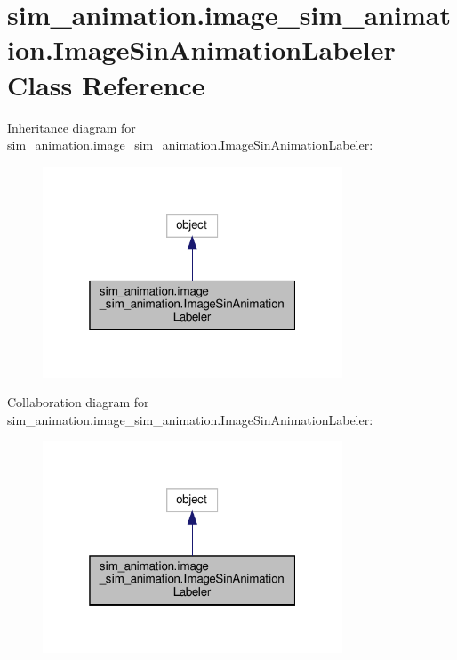 \hypertarget{classsim__animation_1_1image__sim__animation_1_1ImageSinAnimationLabeler}{}\section{sim\+\_\+animation.\+image\+\_\+sim\+\_\+animation.\+Image\+Sin\+Animation\+Labeler Class Reference}
\label{classsim__animation_1_1image__sim__animation_1_1ImageSinAnimationLabeler}


Inheritance diagram for sim\+\_\+animation.\+image\+\_\+sim\+\_\+animation.\+Image\+Sin\+Animation\+Labeler\+:
\nopagebreak
\begin{figure}[H]
\begin{center}
\leavevmode
\includegraphics[width=253pt]{classsim__animation_1_1image__sim__animation_1_1ImageSinAnimationLabeler__inherit__graph}
\end{center}
\end{figure}


Collaboration diagram for sim\+\_\+animation.\+image\+\_\+sim\+\_\+animation.\+Image\+Sin\+Animation\+Labeler\+:
\nopagebreak
\begin{figure}[H]
\begin{center}
\leavevmode
\includegraphics[width=253pt]{classsim__animation_1_1image__sim__animation_1_1ImageSinAnimationLabeler__coll__graph}
\end{center}
\end{figure}
